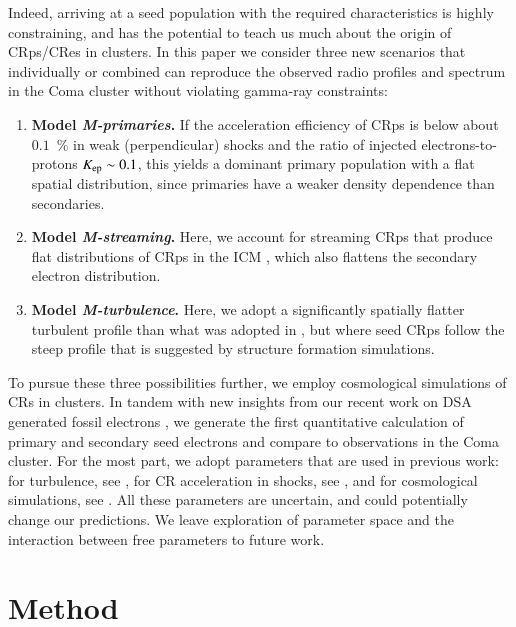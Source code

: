 \documentclass[useAMS,usenatbib]{mn2e}
\begin{document}
Indeed, arriving at a seed population with the required
characteristics is highly constraining, and has the potential to teach
us much about the origin of CRps/CRes in clusters. In this paper we
consider three new scenarios that individually or combined can
reproduce the observed radio profiles and spectrum in the Coma cluster
without violating gamma-ray constraints:
\begin{enumerate}
\item {\bf Model {\em M-primaries}.} If the acceleration efficiency of CRps is below
  about $0.1$~{\%} in weak (perpendicular) shocks and the ratio of injected
  electrons-to-protons $K_{{\mathrm{ep}}} \sim 0.1$, this yields a dominant primary
  population with a flat spatial distribution, since primaries have a weaker
  density dependence than secondaries.
\item {\bf Model {\em M-streaming}.} Here, we account for streaming CRps that
  produce flat distributions of CRps in the ICM
  \citep{ensslin11,wiener13,2014MNRAS.438..124Z}, which also flattens the
  secondary electron distribution.
\item {\bf Model {\em M-turbulence}.} Here, we adopt a significantly spatially
  flatter turbulent profile than what was adopted in \citet{brunetti12},
  but where seed CRps follow the steep profile that is suggested by
  structure formation simulations.
\end{enumerate}

To pursue these three possibilities further, we employ cosmological
simulations of CRs in clusters. In tandem with new insights from our
recent work on DSA generated fossil electrons \citep{pinzke13}, we
generate the first quantitative calculation of primary and secondary
seed electrons and compare to observations in the Coma cluster. For
the most part, we adopt parameters that are used in previous work: for
turbulence, see \citet[][ including turbulent spectrum, injection
  scale, energy density of turbulence]{brunetti07,brunetti11},
for CR acceleration in shocks, see \citet[][ in particular
  $K_{\rmn{ep}}$, acceleration efficiency]{pinzke13}, and for
cosmological simulations, see \citet[][ i.e., shock history,
  temperature profile, density profile, magnetic field
  profile]{pinzke10}. All these parameters are uncertain, and could
potentially change our predictions. We leave exploration of parameter
space and the interaction between free parameters to future work.


\section{Method} 
\end{document}
